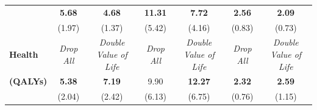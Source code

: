 \documentclass[static]{JJH-Beamer}
\begin{document}
\begin{frame}
\begin{table}[H]
\begin{center}
{\begin{tabular}{>{\bfseries}lcc|cc|cc}
	&	\textbf{5.68}	&	\textbf{4.68}	&	\textbf{11.31}	&	\textbf{7.72}	&	\textbf{2.56}	&	\textbf{2.09}	\\
	&	(1.97)	&	(1.37)	&	(5.42)	&	(4.16)	&	(0.83)	&	(0.73)	\\ \midrule
Health	&	\textit{Drop All}	&	\textit{Double Value of Life}	&	\textit{Drop All}	&	\textit{Double Value of Life}	&	\textit{Drop All}	&	\textit{Double Value of Life}	\\
(QALYs)	&	\textbf{5.38}	&	\textbf{7.19}	&	9.90	&	\textbf{12.27}	&	\textbf{2.32}	&	\textbf{2.59}	\\
	&	(2.04)	&	(2.42)	&	(6.13)	&	(6.75)	&	(0.76)	&	(1.15)	\\ \bottomrule
\end{tabular}
}
\end{center}
\end{table}

\end{frame}
\end{document}
